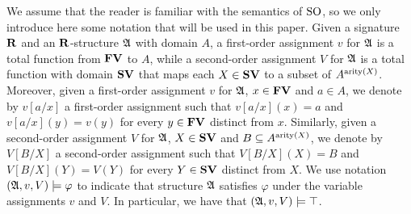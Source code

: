 We assume that the reader is familiar with the semantics of ${\rm SO}$, so we only introduce here some notation that will be used in this paper. 
Given a signature $\mathbf{R}$ and an $\mathbf{R}$-structure $\mathfrak{A}$ with domain $A$, a first-order assignment $v$ for $\mathfrak{A}$ is a total function from $\mathbf{FV}$ to $A$, while a second-order assignment $V$ for $\mathfrak{A}$ is a total function with domain $\mathbf{SV}$ that maps each $X \in \mathbf{SV}$ to a subset of $A^{{\rm arity}(X)}$. Moreover, given a first-order assignment $v$ for $\mathfrak{A}$, $x \in \mathbf{FV}$ and $a \in A$, we denote by $v[a/x]$ a first-order assignment such that $v[a/x](x) = a$ and $v[a/x](y) = v(y)$ for every $y \in \mathbf{FV}$ distinct from $x$. Similarly, given a second-order assignment $V$ for $\mathfrak{A}$, $X \in \mathbf{SV}$ and $B  \subseteq A^{{\rm arity}(X)}$, we denote by $V[B/X]$ a second-order assignment such that $V[B/X](X) = B$ and $V[B/X](Y) = V(Y)$ for every $Y \in \mathbf{SV}$ distinct from $X$. We use notation $(\mathfrak{A}, v, V) \models \varphi$ to indicate that structure $\mathfrak{A}$ satisfies $\varphi$ under the variable assignments $v$ and $V$. In particular, we have that $(\mathfrak{A}, v, V) \models \top$. 


